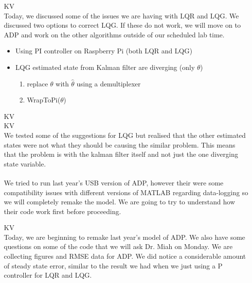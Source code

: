 \documentclass[fontsize=11pt, %
                             paper=letter, %
                             openany, %
                             captions=tableheading,
                             index=totoc,
                             hyperref]{labbook}
\begin{document}
\begin{addmargin}[0cm]{0cm}
KV\\
Today, we discussed some of the issues we are having with LQR and LQG.  We discussed two options to correct LQG.  If these do not work, we will move on to ADP and work on the other algorithms outside of our scheduled lab time. 
\begin{itemize}
    \item Using PI controller on Raspberry Pi (both LQR and LQG)
    \item LQG estimated state from Kalman filter are diverging (only $\theta$)
    \begin{enumerate}
        \item replace $\theta$ with $\hat{\theta}$ using a demultiplexer
        \item WrapToPi($\theta$)
    \end{enumerate}
\end{itemize}

KV\\


KV\\
We tested some of the suggestions for LQG but realised that the other estimated states were not what they should be causing the similar problem.  This means that the problem is with the kalman filter itself and not just the one diverging state variable.\\
\\
We tried to run last year's USB version of ADP, however their were some compatibility issues with different versions of MATLAB regarding data-logging so we will completely remake the model.  We are going to try to understand how their code work first before proceeding.

KV\\
Today, we are beginning to remake last year's model of ADP.  We also have some questions on some of the code that we will ask Dr. Miah on Monday.  We are collecting figures and RMSE data for ADP.  We did notice a considerable amount of steady state error, similar to the result we had when we just using a P controller for LQR and LQG.  


\end{addmargin}
\end{document}
